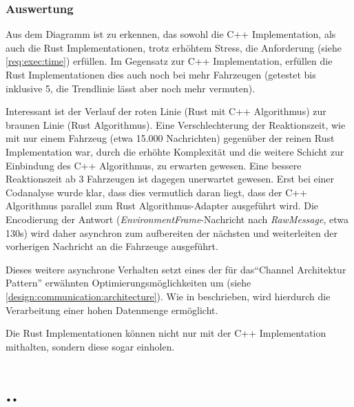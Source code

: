 \subsubsection{Auswertung}

Aus dem Diagramm ist zu erkennen, das sowohl die C++ Implementation, als auch die Rust Implementationen, trotz erhöhtem Stress, die Anforderung  (siehe \autoref{req:exec:time}) erfüllen.
Im Gegensatz zur C++ Implementation, erfüllen die Rust Implementationen dies auch noch bei mehr Fahrzeugen (getestet bis inklusive 5, die Trendlinie lässt aber noch mehr vermuten).

Interessant ist der Verlauf der roten Linie (Rust mit C++ Algorithmus) zur braunen Linie (Rust Algorithmus).
Eine Verschlechterung der Reaktionszeit, wie mit nur einem Fahrzeug (etwa 15.000 Nachrichten) gegenüber der reinen Rust Implementation war, durch die erhöhte Komplexität und die weitere Schicht zur Einbindung des C++ Algorithmus, zu erwarten gewesen.
Eine bessere Reaktionszeit ab 3 Fahrzeugen ist dagegen unerwartet gewesen.
Erst bei einer Codanalyse wurde klar, dass dies vermutlich daran liegt, dass der C++ Algorithmus parallel zum Rust Algorithmus-Adapter ausgeführt wird.
Die Encodierung der Antwort (\textit{EnvironmentFrame}-Nachricht nach \textit{RawMessage}, etwa 130\textmu s) wird daher asynchron zum aufbereiten der nächsten und weiterleiten der vorherigen Nachricht an die Fahrzeuge ausgeführt.

Dieses weitere asynchrone Verhalten setzt eines der für das\enquote{Channel Architektur Pattern} erwähnten Optimierungsmöglichkeiten um (siehe \autoref{design:communication:architecture}).
Wie in  \cite[157]{douglass2003real} beschrieben, wird hierdurch die Verarbeitung einer hohen Datenmenge ermöglicht.

Die Rust Implementationen können nicht nur mit der C++ Implementation mithalten, sondern diese sogar einholen.


\section{..}
